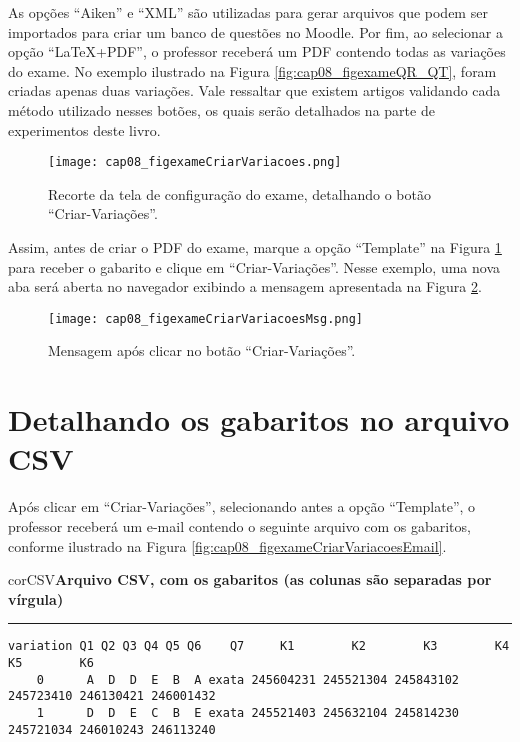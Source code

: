 As opções ``Aiken'' e ``XML'' são utilizadas para gerar arquivos que podem ser importados para criar um banco de questões no Moodle. Por fim, ao selecionar a opção ``LaTeX+PDF'', o professor receberá um PDF contendo todas as variações do exame. No exemplo ilustrado na Figura \ref{fig:cap08_figexameQR_QT}, foram criadas apenas duas variações. Vale ressaltar que existem artigos validando cada método utilizado nesses botões, os quais serão detalhados na parte de experimentos deste livro.

\begin{figure}[!ht]
  \centering
  \texttt{[image: cap08\_figexameCriarVariacoes.png]}
   \caption{Recorte da tela de configuração do exame, detalhando o botão ``Criar-Variações''.}
\label{fig:cap08_figexameCriarVariacoes}
\end{figure}

Assim, antes de criar o PDF do exame, marque a opção ``Template'' na Figura \ref{fig:cap08_figexameCriarVariacoes} para receber o gabarito e clique em ``Criar-Variações''. Nesse exemplo, uma nova aba será aberta no navegador exibindo a mensagem apresentada na Figura \ref{fig:cap08_figexameCriarVariacoesMsg}. 

\begin{figure}[!ht]
  \centering
  \texttt{[image: cap08\_figexameCriarVariacoesMsg.png]}
   \caption{Mensagem após clicar no botão ``Criar-Variações''.}
\label{fig:cap08_figexameCriarVariacoesMsg}
\end{figure}


\section{Detalhando os gabaritos no arquivo CSV}\label{sec:QMgabarito}

Após clicar em ``Criar-Variações'', selecionando antes a opção ``Template'', o professor receberá um e-mail contendo o seguinte arquivo com os gabaritos, conforme ilustrado na Figura \ref{fig:cap08_figexameCriarVariacoesEmail}.

\begin{myboxCode}{corCSV}{\textbf{Arquivo CSV, com os gabaritos (as colunas são separadas por vírgula)}}\vspace{3mm}
\hrule
{\footnotesize
\begin{verbatim}
variation Q1 Q2 Q3 Q4 Q5 Q6    Q7     K1        K2        K3        K4        K5        K6
    0      A  D  D  E  B  A exata 245604231 245521304 245843102 245723410 246130421 246001432
    1      D  D  E  C  B  E exata 245521403 245632104 245814230 245721034 246010243 246113240
\end{verbatim}
}
\end{myboxCode}


